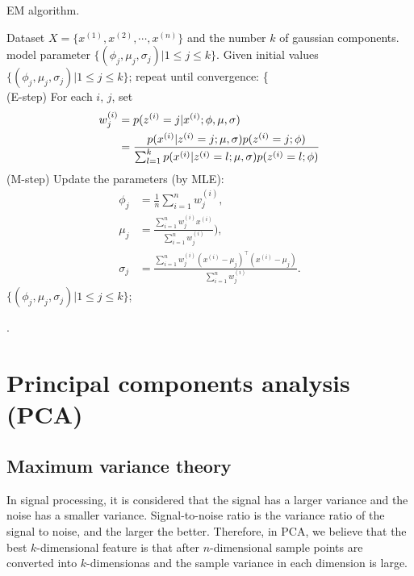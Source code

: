 \documentclass[10pt,onecolumn]{book}
\begin{document}
\begin{algorithm}[h] 
\caption{EM algorithm.} 
\label{alg:Framwork} 
\begin{algorithmic}[1] %
\renewcommand{\algorithmicrequire}{\textbf{Input:}}
\renewcommand{\algorithmicensure}{\textbf{Output:}}
\REQUIRE 
Dataset $X=\{x^{(1)}, x^{(2)}, \cdots, x^{(n)}\}$ and the number $k$ of gaussian components.
\ENSURE 
model parameter $\{(\phi_j, \mu_j, \sigma_j)| 1 \leq j \leq k\}$.
\STATE Given initial values $\{(\phi_j, \mu_j, \sigma_j)| 1 \leq j \leq k\}$;
\STATE \quad repeat until convergence: \{ \\
\STATE \quad \quad (E-step) For each $i$, $j$, set
\begin{equation}
\begin{split}
w_j^{(i)} &= p(z^{(i)} = j | x^{(i)}; \phi, \mu, \sigma) \\
		&= \frac{p(x^{(i)}|z^{(i)} = j; \mu, \sigma) p(z^{(i)} = j; \phi)}{\sum_{l=1}^k p(x^{(i)}|z^{(i)} = l; \mu, \sigma) p(z^{(i)} = l ; \phi)}
\end{split}
\notag
\end{equation}
\STATE \quad \quad (M-step) Update the parameters (by MLE):
\begin{equation}
\begin{split}
\phi_j &= \frac{1}{n} \sum_{i=1}^n w_j^{(i)}, \\
\mu_j &= \frac{\sum_{i=1}^n w_j^{(i)} x^{(i)}}{\sum_{i=1}^n w_j^{(i)}}), \\
\sigma_j &= \frac{\sum_{i=1}^n w_j^{(i)} (x^{(i)}-\mu_j)^\top (x^{(i)}-\mu_j)}{\sum_{i=1}^n w_j^{(i)}}.
\end{split}
\end{equation}
\RETURN $\{(\phi_j, \mu_j, \sigma_j)| 1 \leq j \leq k\}$;
\end{algorithmic}
\end{algorithm}
.

\section{Principal components analysis (PCA)}
\subsection{Maximum variance theory}
In signal processing, it is considered that the signal has a larger variance and the noise has a smaller variance. Signal-to-noise ratio is the variance ratio of the signal to noise, and the larger the better. Therefore, in PCA, we believe that the best $k$-dimensional feature is that after $n$-dimensional sample points are converted into $k$-dimensionas and the sample variance in each dimension is large.
\end{document}
